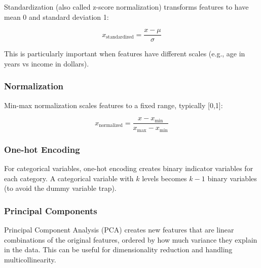 Standardization (also called z-score normalization) transforms features to have mean 0 and standard deviation 1:

\begin{equation}
x_{\text{standardized}} = \frac{x - \mu}{\sigma}
\label{eq:standardization}
\end{equation}

This is particularly important when features have different scales (e.g., age in years vs income in dollars).

\subsubsection{Normalization}

Min-max normalization scales features to a fixed range, typically [0,1]:

\begin{equation}
x_{\text{normalized}} = \frac{x - x_{\min}}{x_{\max} - x_{\min}}
\label{eq:normalization}
\end{equation}

\subsubsection{One-hot Encoding}

For categorical variables, one-hot encoding creates binary indicator variables for each category. A categorical variable with $k$ levels becomes $k-1$ binary variables (to avoid the dummy variable trap).

\subsubsection{Principal Components}

Principal Component Analysis (PCA) creates new features that are linear combinations of the original features, ordered by how much variance they explain in the data. This can be useful for dimensionality reduction and handling multicollinearity.